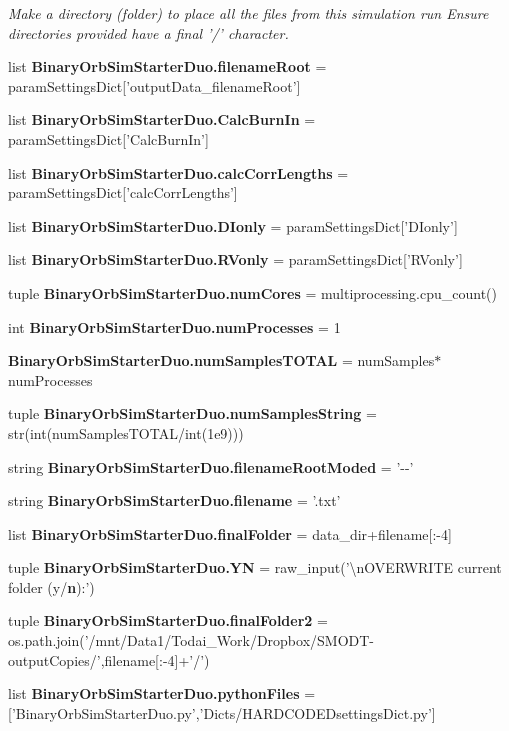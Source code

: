 \begin{DoxyCompactItemize}
\begin{DoxyCompactList}\small\item\em Make a directory (folder) to place all the files from this simulation run Ensure directories provided have a final '/' character. \end{DoxyCompactList}\item 
list {\bf Binary\-Orb\-Sim\-Starter\-Duo.\-filename\-Root} = param\-Settings\-Dict['output\-Data\-\_\-filename\-Root']
\item 
list {\bf Binary\-Orb\-Sim\-Starter\-Duo.\-Calc\-Burn\-In} = param\-Settings\-Dict['Calc\-Burn\-In']
\item 
list {\bf Binary\-Orb\-Sim\-Starter\-Duo.\-calc\-Corr\-Lengths} = param\-Settings\-Dict['calc\-Corr\-Lengths']
\item 
list {\bf Binary\-Orb\-Sim\-Starter\-Duo.\-D\-Ionly} = param\-Settings\-Dict['D\-Ionly']
\item 
list {\bf Binary\-Orb\-Sim\-Starter\-Duo.\-R\-Vonly} = param\-Settings\-Dict['R\-Vonly']
\item 
tuple {\bf Binary\-Orb\-Sim\-Starter\-Duo.\-num\-Cores} = multiprocessing.\-cpu\-\_\-count()
\item 
int {\bf Binary\-Orb\-Sim\-Starter\-Duo.\-num\-Processes} = 1
\item 
{\bf Binary\-Orb\-Sim\-Starter\-Duo.\-num\-Samples\-T\-O\-T\-A\-L} = num\-Samples$\ast$num\-Processes
\item 
tuple {\bf Binary\-Orb\-Sim\-Starter\-Duo.\-num\-Samples\-String} = str(int(num\-Samples\-T\-O\-T\-A\-L/int(1e9)))
\item 
string {\bf Binary\-Orb\-Sim\-Starter\-Duo.\-filename\-Root\-Moded} = '-\/-\/'
\item 
string {\bf Binary\-Orb\-Sim\-Starter\-Duo.\-filename} = '.txt'
\item 
list {\bf Binary\-Orb\-Sim\-Starter\-Duo.\-final\-Folder} = data\-\_\-dir+filename[\-:-\/4]
\item 
tuple {\bf Binary\-Orb\-Sim\-Starter\-Duo.\-Y\-N} = raw\-\_\-input('\textbackslash{}n\-O\-V\-E\-R\-W\-R\-I\-T\-E current folder (y/{\bf n})\-:')
\item 
tuple {\bf Binary\-Orb\-Sim\-Starter\-Duo.\-final\-Folder2} = os.\-path.\-join('/mnt/Data1/Todai\-\_\-\-Work/Dropbox/S\-M\-O\-D\-T-\/output\-Copies/',filename[\-:-\/4]+'/')
\item 
list {\bf Binary\-Orb\-Sim\-Starter\-Duo.\-python\-Files} = ['Binary\-Orb\-Sim\-Starter\-Duo.\-py','Dicts/H\-A\-R\-D\-C\-O\-D\-E\-Dsettings\-Dict.\-py']

\end{DoxyCompactItemize}
